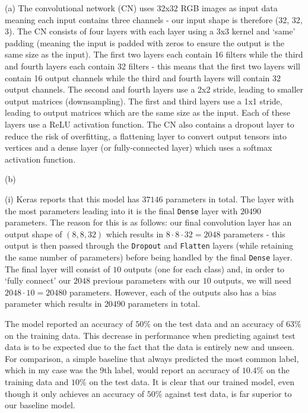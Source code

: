\documentclass[12pt]{article}
\begin{document}
\noindent (a) The convolutional network (CN) uses 32x32 RGB images as input data meaning each input contains three channels - our input shape is therefore (32, 32, 3). The CN consists of four layers with each layer using a 3x3 kernel and `same' padding (meaning the input is padded with zeros to ensure the output is the same size as the input). The first two layers each contain 16 filters while the third and fourth layers each contain 32 filters - this means that the first two layers will contain 16 output channels while the third and fourth layers will contain 32 output channels. The second and fourth layers use a 2x2 stride, leading to smaller output matrices (downsampling). The first and third layers use a 1x1 stride, leading to output matrices which are the same size as the input. Each of these layers use a ReLU activation function. The CN also contains a dropout layer to reduce the risk of overfitting, a flattening layer to convert output tensors into vertices and a dense layer (or fully-connected layer) which uses a softmax activation function.

\noindent (b)

\indent (i) Keras reports that this model has $37146$ parameters in total. The layer with the most parameters leading into it is the final \texttt{Dense} layer with $20490$ parameters. The reason for this is as follows: our final convolution layer has an output shape of $(8, 8, 32)$ which results in $8 \cdot8 \cdot 32 = 2048$ parameters - this output is then passed through the \texttt{Dropout} and \texttt{Flatten} layers (while retaining the same number of parameters) before being handled by the final \texttt{Dense} layer. The final layer will consist of $10$ outputs (one for each class) and, in order to `fully connect' our $2048$ previous parameters with our $10$ outputs, we will need $2048 \cdot 10 = 20480$ parameters. However, each of the outputs also has a bias parameter which results in $20490$ parameters in total.

The model reported an accuracy of $50\%$ on the test data and an accuracy of $63\%$ on the training data. This decrease in performance when predicting against test data is to be expected due to the fact that the data is entirely new and unseen. For comparison, a simple baseline that always predicted the most common label, which in my case was the 9th label, would report an accuracy of $10.4\%$ on the training data and $10\%$ on the test data. It is clear that our trained model, even though it only achieves an accuracy of $50\%$ against test data, is far superior to our baseline model.
\end{document}
